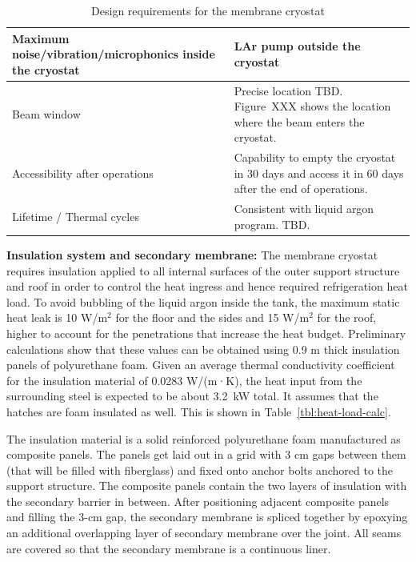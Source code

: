 \begin{table}[htpb]
\begin{tabular}{|p{}|p{}|}
Maximum noise/vibration/microphonics inside the cryostat   & LAr pump outside the cryostat  \\ \hline
Beam window   & Precise location TBD. Figure~XXX shows the location where the beam enters the cryostat.  \\ \hline
 Accessibility after operations  & Capability to empty the cryostat in 30 days and access it in 60 days after the end of operations. \\ \hline
  Lifetime / Thermal cycles &  Consistent with liquid argon program. TBD. \\ \hline
 \end{tabular}
\caption{Design requirements for the membrane cryostat}
\label{tbl:cryogenics-design-parameters}
\end{table}

\textbf{Insulation system and secondary membrane: }
%
The membrane cryostat requires insulation applied to all internal surfaces of the outer support structure 
and roof in order to control the heat ingress and hence required refrigeration heat load. 
To avoid bubbling of the liquid argon inside the tank, the maximum static heat leak is 10 W/m$^2$ for the floor and the sides and 15 W/m$^2$ for the roof, higher to account for the penetrations that increase the heat budget. Preliminary calculations show that these values can be obtained using 0.9 m thick insulation panels of polyurethane foam.
Given an 
average thermal conductivity coefficient for the insulation material of 0.0283 W/(m·K), the heat input 
from the surrounding steel is expected to be about 3.2~kW total. It assumes that the hatches are foam 
insulated as well. This is shown in Table~\ref{tbl:heat-load-calc}.

The insulation material is a solid reinforced polyurethane foam manufactured as composite panels. The 
panels get laid out in a grid with 3 cm gaps between them (that will be filled with fiberglass) and fixed 
onto anchor bolts anchored to the support structure. The composite panels contain the two layers of 
insulation with the secondary barrier in between. After positioning adjacent composite panels and filling 
the 3-cm gap, the secondary membrane is spliced together by epoxying an additional overlapping layer 
of secondary membrane over the joint. All seams are covered so that the secondary membrane is a 
continuous liner.

